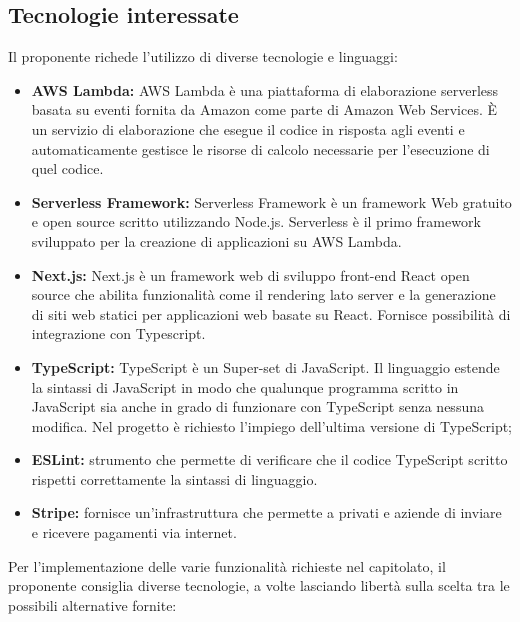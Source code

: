 \subsection{Tecnologie interessate}
Il proponente richede l’utilizzo di diverse tecnologie e linguaggi:
\begin{itemize}
    \item \textbf{AWS Lambda:} AWS Lambda è una piattaforma di elaborazione serverless basata su eventi fornita da Amazon come parte di Amazon Web Services. È un servizio di elaborazione che esegue il codice in risposta agli eventi e automaticamente gestisce le risorse di calcolo necessarie per l'esecuzione di quel codice.
    \item \textbf{Serverless Framework:} Serverless Framework è un framework Web gratuito e open source scritto utilizzando Node.js. Serverless è il primo framework sviluppato per la creazione di applicazioni su AWS Lambda.
    \item \textbf{Next.js:} Next.js è un framework web di sviluppo front-end React open source che abilita funzionalità come il rendering lato server e la generazione di siti web statici per applicazioni web basate su React. Fornisce possibilità di integrazione con Typescript.
    \item \textbf{TypeScript:} TypeScript è un Super-set di JavaScript. Il linguaggio estende la sintassi di JavaScript in modo che qualunque programma scritto in JavaScript sia anche in grado di funzionare con TypeScript senza nessuna modifica. Nel progetto è richiesto l'impiego dell'ultima versione di TypeScript;
    \item \textbf{ESLint:} strumento che permette di verificare che il codice TypeScript scritto rispetti correttamente la sintassi di linguaggio.
    \item \textbf{Stripe:} fornisce un’infrastruttura che permette a privati e aziende di inviare e ricevere pagamenti via internet.
\end{itemize}
Per l'implementazione delle varie funzionalità richieste nel capitolato, il proponente consiglia diverse tecnologie, a volte lasciando libertà sulla scelta tra le possibili alternative fornite:
